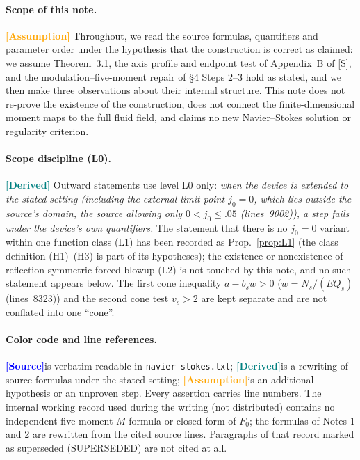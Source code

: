 \documentclass[11pt,a4paper]{article}
\theoremstyle{definition}
\theoremstyle{remark}
\newcommand{\lnos}[1]{(lines~#1)}
\newcommand{\ORIG}{\textcolor{blue}{\textbf{[Source]}}}
\newcommand{\DER}{\textcolor{teal}{\textbf{[Derived]}}}
\newcommand{\HYP}{\textcolor{orange}{\textbf{[Assumption]}}}
\begin{document}
\paragraph{Scope of this note.}
\HYP
Throughout, we read the source formulas, quantifiers and parameter order under the hypothesis that the
construction is correct as claimed: we assume Theorem~3.1, the axis profile and endpoint test of
Appendix~B of [S], and the modulation--five-moment repair of \S4 Steps 2--3 hold as stated, and we then
make three observations about their internal structure.
This note does not re-prove the existence of the construction, does not connect the finite-dimensional
moment maps to the full fluid field, and claims no new Navier--Stokes solution or regularity criterion.

\paragraph{Scope discipline (L0).}
\DER
Outward statements use level L0 only:
\emph{when the device is extended to the stated setting (including the external limit point $j_0=0$,
which lies outside the source's domain, the source allowing only $0<j_0\le.05$ \lnos{9002}),
a step fails under the device's own quantifiers.}
The statement that there is no $j_0=0$ variant within one function class (L1) has been recorded as
Prop.~\ref{prop:L1} (the class definition (H1)--(H3) is part of its hypotheses);
the existence or nonexistence of reflection-symmetric forced blowup (L2) is not touched by this note,
and no such statement appears below.
The first cone inequality $a-b_s w>0$ ($w=N_s/(EQ_s)$\lnos{8323}) and the second cone test $v_s>2$
are kept separate and are not conflated into one ``cone''.

\paragraph{Color code and line references.}
\ORIG is verbatim readable in \texttt{navier-stokes.txt};
\DER is a rewriting of source formulas under the stated setting;
\HYP is an additional hypothesis or an unproven step.
Every assertion carries line numbers. The internal working record used during the writing (not
distributed) contains no independent five-moment $M$ formula or closed form of $F_0$;
the formulas of Notes 1 and 2 are rewritten from the cited source lines.
Paragraphs of that record marked as superseded (SUPERSEDED) are not cited at all.
\end{document}
